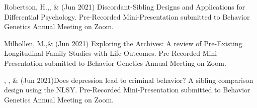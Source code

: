
\item Robertson, H.,\noteA \Joe, \&  \meb (Jun 2021) Discordant-Sibling Designs and Applications for Differential Psychology. Pre-Recorded Mini-Presentation submitted to Behavior Genetics Annual Meeting on Zoom.

\item Milhollen, M.,\noteA \&  \meb (Jun 2021) Exploring the Archives: A review of Pre-Existing Longitudinal Family Studies with Life Outcomes. Pre-Recorded Mini-Presentation submitted to Behavior Genetics Annual Meeting on Zoom.

\item \emsims, \jt,  \&  \meb (Jun 2021)Does depression lead to criminal behavior? A sibling comparison design using the NLSY. Pre-Recorded Mini-Presentation submitted to Behavior Genetics Annual Meeting on Zoom.

